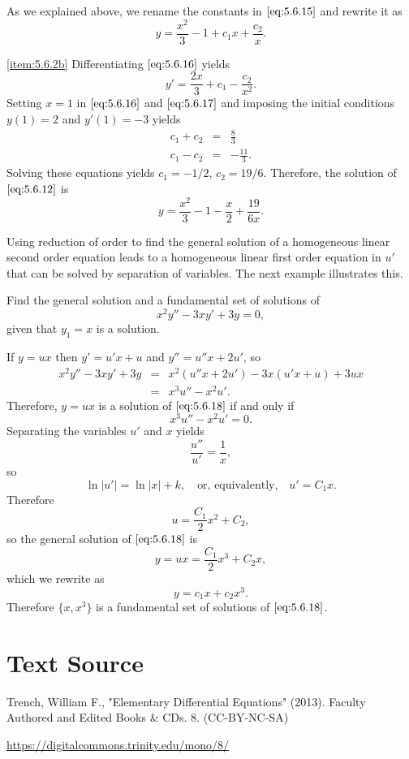 \documentclass{ximera}
\begin{document}
\begin{example}
\begin{explanation}
As we explained above, we rename the constants in $\eqref{eq:5.6.15}$ and
rewrite it as
\begin{equation}  \label{eq:5.6.16}
y=\frac{x^2}{3}-1+c_1x+\frac{c_2}{x}.
\end{equation}
 
\ref{item:5.6.2b}   Differentiating  $\eqref{eq:5.6.16}$ yields
\begin{equation} \label{eq:5.6.17}
y'=\frac{2x}{3}+c_1-\frac{c_2}{x^2}.
\end{equation}
Setting $x=1$ in  $\eqref{eq:5.6.16}$ and  $\eqref{eq:5.6.17}$ and imposing the initial conditions $y(1)=2$ and $y'(1)=-3$ yields
\begin{eqnarray*}
c_1+c_2&=& \frac{8}{3} \\
c_1-c_2&=& -\frac{11}{3}.
\end{eqnarray*}
Solving these equations yields $c_1=-1/2$, $c_2=19/6$.
Therefore, the solution of $\eqref{eq:5.6.12}$ is
$$
y=\frac{x^2}{3}-1-\frac{x}{2}+\frac{19}{6x}.
$$
\end{explanation}
\end{example}
 
 
Using reduction of order to  find the general solution of
a homogeneous linear second order  equation leads to a
homogeneous linear first  order  equation in $u'$ that can be solved
by separation of variables. The next example illustrates this.
 
\begin{example}\label{example:5.6.3}
 Find the general solution and a fundamental set  of solutions of
\begin{equation}  \label{eq:5.6.18}
x^2y''-3xy'+3y=0,
\end{equation}
 given that $y_1=x$ is a solution.
 
 
\begin{explanation}
 If $y=ux$ then $y'=u'x+u$ and $y''=u''x+2u'$, so
\begin{eqnarray*}
x^2y''-3xy'+3y&=&x^2(u''x+2u')-3x(u'x+u)+3ux\\
&=&x^3u''-x^2u'.
\end{eqnarray*}
Therefore, $y=ux$ is a solution of $\eqref{eq:5.6.18}$ if and only if
$$
x^3u''-x^2u'=0.
$$
Separating the variables $u'$ and $x$ yields
$$
\frac{u''}{u'}=\frac{1}{x},
$$
so
$$
\ln|u'|=\ln|x|+k,\quad\mbox{or, equivalently,}\quad u'=C_1x.
$$
Therefore
$$
u=\frac{C_1}{2}x^2+C_2,
$$
so the general solution of $\eqref{eq:5.6.18}$ is
$$
y=ux=\frac{C_1}{2}x^3+C_2x,
$$
which we rewrite as
$$
y=c_1x+c_2x^3.
$$
Therefore $\{x,x^3\}$ is  a fundamental set of solutions of
$\eqref{eq:5.6.18}$.
\end{explanation}
\end{example}
 
 
\section*{Text Source}
Trench, William F., "Elementary Differential Equations" (2013). Faculty Authored and Edited Books \& CDs. 8. (CC-BY-NC-SA)
 
\href{https://digitalcommons.trinity.edu/mono/8/}{https://digitalcommons.trinity.edu/mono/8/}
 
\end{document}
